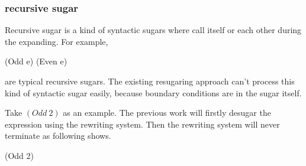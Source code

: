 \subsubsection{recursive sugar}
Recursive sugar is a kind of syntactic sugars where call itself or each other during the expanding. For example,

\begin{Codes}	
(Odd e) 	
(Even e) 	
\end{Codes}	
are typical recursive sugars. The existing resugaring approach can't process this kind of syntactic sugar easily, because boundary conditions are in the sugar itself.

Take $(Odd~2)$ as an example. The previous work will firstly desugar the expression using the rewriting system. Then the rewriting system will never terminate as following shows.
\begin{Codes}
   (Odd 2)
\end{Codes}
				

